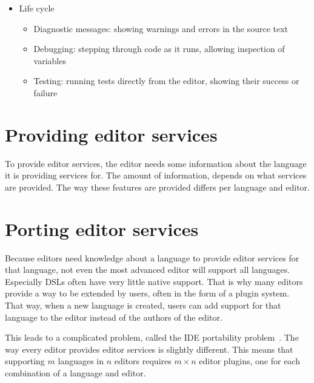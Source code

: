 \begin{itemize}
    \item Life cycle
    \begin{itemize}
        \item Diagnostic messages: showing warnings and errors in the source text
        \item Debugging: stepping through code as it runs, allowing inspection of variables
        \item Testing: running tests directly from the editor, showing their success or failure
    \end{itemize}
\end{itemize}

\section{Providing editor services}\label{sec:providing-editor-services}

To provide editor services, the editor needs some information about the language it is providing services for.
The amount of information, depends on what services are provided.
The way these features are provided differs per language and editor.



\section{Porting editor services}\label{sec:porting-editor-services}

Because editors need knowledge about a language to provide editor services for that language, not even the most advanced editor will support all languages.
Especially \acp{DSL} often have very little native support.
That is why many editors provide a way to be extended by users, often in the form of a plugin system.
That way, when a new language is created, users can add support for that language to the editor instead of the authors of the editor.

This leads to a complicated problem, called the \ac{IDE} portability problem~\autocite{KeidelPE16}.
The way every editor provides editor services is slightly different.
This means that supporting $m$ languages in $n$ editors requires $m \times n$ editor plugins, one for each
combination of a language and editor.

